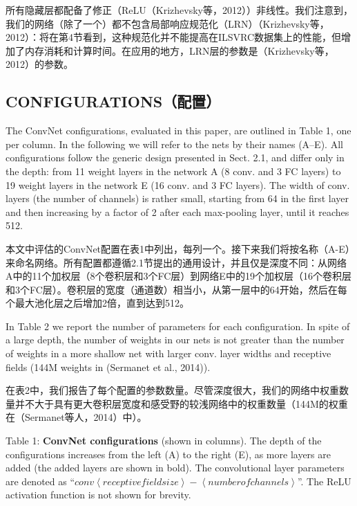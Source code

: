 \documentclass[12pt,a4paper,UTF8,twoside]{book}
\begin{document}
所有隐藏层都配备了修正（ReLU（Krizhevsky等，2012））非线性。我们注意到，我们的网络（除了一个）都不包含局部响应规范化（LRN）（Krizhevsky等，2012）：将在第4节看到，这种规范化并不能提高在ILSVRC数据集上的性能，但增加了内存消耗和计算时间。在应用的地方，LRN层的参数是（Krizhevsky等，2012）的参数。

\hypertarget{configurationsux914dux7f6e}{%
\subsection{CONFIGURATIONS（配置）}\label{configurationsux914dux7f6e}}

The ConvNet configurations, evaluated in this paper, are outlined in Table 1, one per column. In the following we will refer to the nets by their names (A--E). All configurations follow the generic design presented in Sect. 2.1, and differ only in the depth: from 11 weight layers in the network A (8 conv. and 3 FC layers) to 19 weight layers in the network E (16 conv. and 3 FC layers). The width of conv. layers (the number of channels) is rather small, starting from 64 in the first layer and then increasing by a factor of 2 after each max-pooling layer, until it reaches 512.

本文中评估的ConvNet配置在表1中列出，每列一个。接下来我们将按名称（A-E）来命名网络。所有配置都遵循2.1节提出的通用设计，并且仅是深度不同：从网络A中的11个加权层（8个卷积层和3个FC层）到网络E中的19个加权层（16个卷积层和3个FC层）。卷积层的宽度（通道数）相当小，从第一层中的64开始，然后在每个最大池化层之后增加2倍，直到达到512。

In Table 2 we report the number of parameters for each configuration. In spite of a large depth, the number of weights in our nets is not greater than the number of weights in a more shallow net with larger conv. layer widths and receptive fields (144M weights in (Sermanet et al., 2014)).

在表2中，我们报告了每个配置的参数数量。尽管深度很大，我们的网络中权重数量并不大于具有更大卷积层宽度和感受野的较浅网络中的权重数量（144M的权重在（Sermanet等人，2014）中）。

Table 1: \textbf{ConvNet configurations} (shown in columns). The depth of the configurations increases from the left (A) to the right (E), as more layers are added (the added layers are shown in bold). The convolutional layer parameters are denoted as ``\(conv \left\langle receptive field size \right\rangle - \left\langle number of channels \right\rangle\)''. The ReLU activation function is not shown for brevity.
\end{document}
